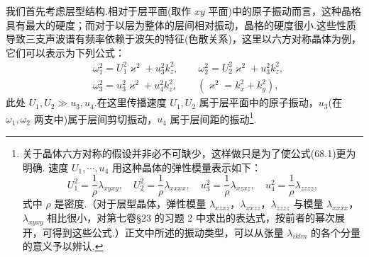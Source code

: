 我们首先考虑层型结构.相对于层平面(取作 $xy$ 平面)中的原子振动而言，这种晶格具有最大的硬度；而对于以层为整体的层间相对振动，晶格的硬度很小.这些性质导致三支声波谱有频率依赖于波矢的特征(色散关系)，这里以六方对称晶体为例，它们可以表示为下列公式：
\begin{equation}
\begin{aligned}
  &\omega_1^2=U_1^2\varkappa^2+u_3^2k_z^2,\qquad
   \omega_2^2=U_2^2\varkappa^2+u_3^2k_z^2,\\
  &\omega_3^2=u_3^2\varkappa^2+u_4^2k_z^2,\qquad
   \left(\varkappa^2=k_x^2+k_y^2\right),
\end{aligned}
\end{equation}
此处 $U_1,U_2\gg u_3,u_4$.在这里传播速度 $U_1,U_2$ 属于层平面中的原子振动，$u_3$(在 $\omega_1,\omega_2$ 两支中)属于层间剪切振动，$u_4$ 属于层间距的振动\footnote{关于晶体六方对称的假设并非必不可缺少，这样做只是为了使公式(68.1)更为明确. 速度 $U_1,\cdots,u_4$ 用这种晶体的弹性模量表示如下：
\begin{equation*}
  U_1^2=\frac{1}{\rho}\lambda_{xyxy},\quad U_2^2=\frac{1}{\rho}\lambda_{xxxx},\quad
  u_3^2=\frac{1}{\rho}\lambda_{xzxz},\quad u_4^2=\frac{1}{\rho}\lambda_{zzzz},
\end{equation*}
式中 $\rho$ 是密度.（对于层型晶体，弹性模量 $\lambda_{xzxz}$，$\lambda_{xxzz}$，$\lambda_{zzzz}$ 与模量 $\lambda_{xxxx}$，$\lambda_{xyxy}$ 相比很小，对第七卷§23 的习题 2 中求出的表达式，按前者的幂次展开，可得到这些公式.）正文中所述的振动类型，可以从张量 $\lambda_{iklm}$ 的各个分量的意义予以辨认.}.

